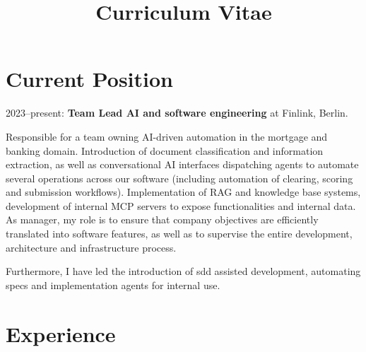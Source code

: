 \documentclass[11pt,a4paper,sans]{moderncv}
\title{Curriculum Vitae}
\begin{document}
\makecvtitle


\section{Current Position} 2023--present: \textbf{Team Lead AI and software
	engineering} at Finlink, Berlin.

\bigskip Responsible for a team owning AI-driven automation in the
mortgage and banking domain. Introduction of document classification and information
extraction, as well as conversational AI interfaces
dispatching agents to automate several operations across our
software (including automation of clearing, scoring and submission workflows).
Implementation of RAG and knowledge base systems, development of internal
MCP servers to expose functionalities and internal data. As
manager, my role is to ensure that company objectives are efficiently
translated into software features, as well as to supervise the entire
development, architecture and infrastructure process.

\smallskip
Furthermore, I have led the introduction of sdd assisted development, automating
specs and implementation agents for internal use.

\section{Experience}


\end{document}

